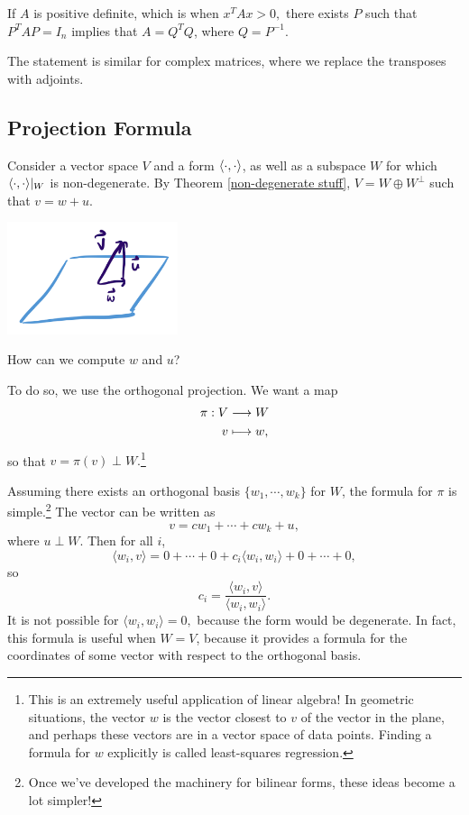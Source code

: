 If $A$ is positive definite, which is when $x^T Ax > 0,$ there exists $P$ such that $P^TAP = I_n$ implies that $A = Q^TQ$, where $Q= P^{-1}$.

The statement is similar for complex matrices, where we replace the transposes with adjoints.



\subsection{Projection Formula}

Consider a vector space $V$ and a form $\langle \cdot, \cdot \rangle$, as well as a subspace $W$ for which $\langle \cdot, \cdot \rangle|_W$ is non-degenerate. By Theorem \ref{non-degenerate stuff}, $V = W \oplus W^\perp$ such that $v = w + u.$ 

\begin{center}
    \includegraphics[width=5cm]{Lecture Files and Images/lec26-projection.png}
\end{center}

\begin{qq}
How can we compute $w$ and $u$?
\end{qq}
To do so, we use the orthogonal projection. We want a map
\begin{align*}
    \pi: V &\longrightarrow W \\
    v &\longmapsto w,
\end{align*}
so that $v = \pi(v) \perp W.$\footnote{This is an extremely useful application of linear algebra! In geometric situations, the vector $w$ is the vector closest to $v$ of the vector in the plane, and perhaps these vectors are in a vector space of data points. Finding a formula for $w$ explicitly is called least-squares regression.}

Assuming there exists an orthogonal basis $\{w_1, \cdots, w_k\}$ for $W$, the formula for $\pi$ is simple.\footnote{Once we've developed the machinery for bilinear forms, these ideas become a lot simpler!} The vector can be written as 
\[
v = cw_1 + \cdots + cw_k + u,
\]
where $u \perp W.$ Then for all $i$, 
\[
\langle w_i, v \rangle = 0 + \cdots + 0 +c_i \langle w_i, w_i \rangle + 0 + \cdots + 0,
\]
so 
\[
c_i = \frac{\langle w_i, v\rangle}{\langle w_i, w_i \rangle}.
\]
It is not possible for $\langle w_i, w_i\rangle = 0,$ because the form would be degenerate. In fact, this formula is useful when $W = V$, because it provides a formula for the coordinates of some vector with respect to the orthogonal basis. 

